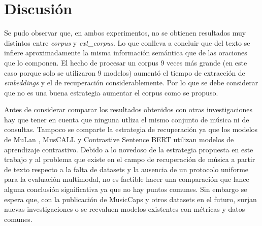 \section{Discusión}
\label{sec:final-discution}
Se pudo observar que, en ambos experimentos, no se obtienen resultados muy distintos entre \textit{corpus} y \textit{ext\_corpus}. Lo que conlleva a concluir que del texto se infiere aproximadamente la misma información semántica que de las oraciones que lo componen. El hecho de procesar un corpus 9 veces más grande (en este caso porque solo se utilizaron 9 modelos) aumentó el tiempo de extracción de \textit{embeddings} y el de recuperación considerablemente. Por lo que se debe considerar que no es una buena estrategia aumentar el corpus como se propuso. 

Antes de considerar comparar los resultados obtenidos con otras investigaciones hay que tener en cuenta que ninguna utliza el mismo conjunto de música ni de consultas. Tampoco se comparte la estrategia de recuperación ya que los modelos de MuLan \cite{Huang2022MuLanAJ}, MusCALL \cite{Manco2022ContrastiveAL} y Contrastive Sentence BERT \cite{Doh2022TowardUT} utilizan modelos de aprendizaje contrastivo. Debido a lo novedoso de la estrategia propuesta en este trabajo y al problema que existe en el campo de recuperación de música a partir de texto respecto a la falta de datasets y la ausencia de un protocolo uniforme para la evaluación multimodal, no es factible hacer una comparación que lance alguna conclusión significativa ya que no hay puntos comunes. Sin embargo se espera que, con la publicación de MusicCaps \cite{Agostinelli2023MusicLMGM} y otros datasets en el futuro, surjan nuevas investigaciones o se reevaluen modelos existentes con métricas y datos comunes. 
